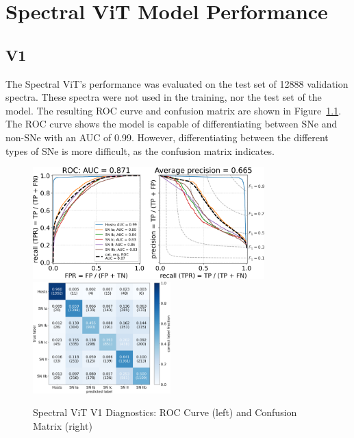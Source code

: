 \chapter{Spectral ViT Model Performance}
\label{chap:chapter-4}


\section{V1}\label{sec:v1_results}
The Spectral ViT's performance was evaluated on the test set of 12888 validation spectra.
These spectra were not used in the training, nor the test set of the model. The resulting 
ROC curve and confusion matrix are shown in Figure~\ref{fig:v1_qual}. The ROC curve 
shows the model is capable of differentiating between SNe and non-SNe with an AUC of 0.99.
However, differentiating between the different types of SNe is more difficult, as the
confusion matrix indicates. 
\begin{figure}
    \centering
    \includegraphics[height=4.3cm]{figures/v1_real/vit_model_V1_original_redorocfulle_e31.png}
    \quad
    \includegraphics[height=4.3cm]{figures/v1_real/vit_model_V1_original_redocmfull_e31.png}
    \caption{Spectral ViT V1 Diagnostics: ROC Curve (left) and Confusion Matrix (right)\label{fig:v1_qual}}
\end{figure}

